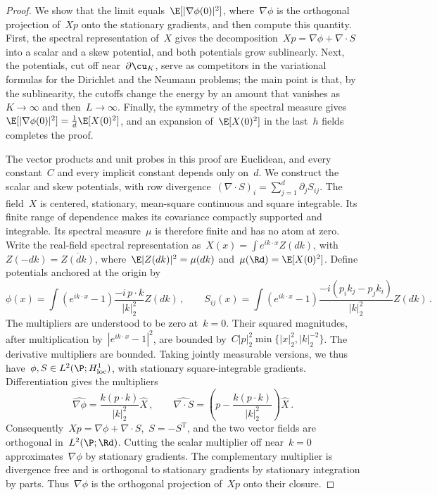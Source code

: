\documentclass[11pt]{amsart}
\begin{document}
\begin{proof}
We show that the limit equals~$\E[|\nabla\phi(0)|^2]$, where~$\nabla\phi$ is the orthogonal projection of~$Xp$ onto the stationary gradients, and then compute this quantity. First, the spectral representation of~$X$ gives the decomposition~$Xp=\nabla\phi+\nabla\cdot S$ into a scalar and a skew potential, and both potentials grow sublinearly. Next, the potentials, cut off near~$\partial\cu_K$, serve as competitors in the variational formulas for the Dirichlet and the Neumann problems; the main point is that, by the sublinearity, the cutoffs change the energy by an amount that vanishes as~$K\to\infty$ and then~$L\to\infty$. Finally, the symmetry of the spectral measure gives~$\E[|\nabla\phi(0)|^2]=\frac1d\E[X(0)^2]$, and an expansion of~$\E[X(0)^2]$ in the last~$h$ fields completes the proof.

\smallskip

The vector products and unit probes in this proof are Euclidean, and every constant~$C$ and every implicit constant depends only on~$d$. We construct the scalar and skew potentials, with row divergence~$(\nabla\cdot S)_i=\sum_{j=1}^d\partial_jS_{ij}$. The field~$X$ is centered, stationary, mean-square continuous and square integrable. Its finite range of dependence makes its covariance compactly supported and integrable. Its spectral measure~$\mu$ is therefore finite and has no atom at zero. Write the real-field spectral representation as~$X(x)=\int e^{ik\cdot x}Z(dk)$, with~$Z(-dk)=\overline{Z(dk)}$, where~$\E|Z(dk)|^2=\mu(dk)$ and~$\mu(\Rd)=\E[X(0)^2]$. Define potentials anchored at the origin by
\begin{equation*}
	\phi(x)=\int(e^{ik\cdot x}-1)\frac{-i\,p\cdot k}{|k|_2^2}Z(dk)\,,
	\qquad
	S_{ij}(x)=\int(e^{ik\cdot x}-1)\frac{-i(p_i k_j-p_j k_i)}{|k|_2^2}Z(dk)\,.
\end{equation*}
The multipliers are understood to be zero at~$k=0$. Their squared magnitudes, after multiplication by~$|e^{ik\cdot x}-1|^2$, are bounded by~$C|p|_2^2\min\{|x|_2^2,|k|_2^{-2}\}$. The derivative multipliers are bounded. Taking jointly measurable versions, we thus have~$\phi,S\in L^2(\P;H^1_{\mathrm{loc}})$, with stationary square-integrable gradients. Differentiation gives the multipliers
\begin{equation*}
	\widehat{\nabla\phi}=\frac{k(p\cdot k)}{|k|_2^2}\widehat X\,,
	\qquad
	\widehat{\nabla\cdot S}=\left(p-\frac{k(p\cdot k)}{|k|_2^2}\right)\widehat X\,.
\end{equation*}
Consequently~$Xp=\nabla\phi+\nabla\cdot S$,~$S=-S^{\mathrm T}$, and the two vector fields are orthogonal in~$L^2(\P;\Rd)$. Cutting the scalar multiplier off near~$k=0$ approximates~$\nabla\phi$ by stationary gradients. The complementary multiplier is divergence free and is orthogonal to stationary gradients by stationary integration by parts. Thus~$\nabla\phi$ is the orthogonal projection of~$Xp$ onto their closure.


\end{proof}
\end{document}
